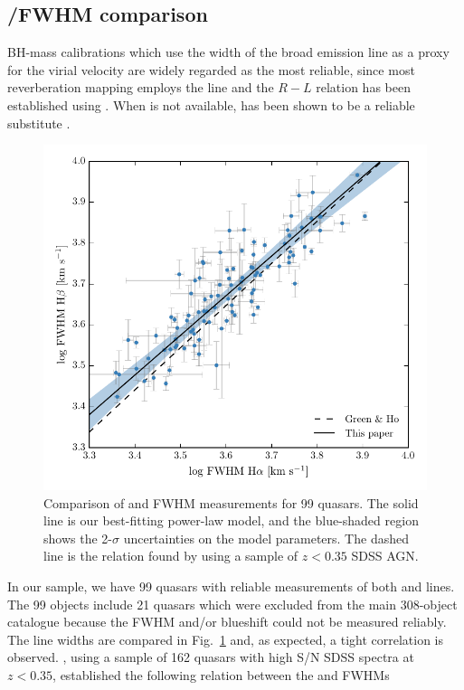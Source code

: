 \subsection{\hans/\hb FWHM comparison}
\label{sec:hahbcomparison}

BH-mass calibrations which use the width of the broad \hb emission line as a proxy for the virial velocity are widely regarded as the most reliable, since most reverberation mapping employs the \hb line and the $R-L$ relation has been established using \hbns.
When \hb is not available, \ha has been shown to be a reliable substitute \citep[e.g.][]{greene05,shen11,shen12}. 

\begin{figure}
    \centering 
    \includegraphics[width=0.8\columnwidth]{figures/chapter03/ha_hb_width_comparison.pdf} 
    \caption{Comparison of \ha and \hb FWHM measurements for 99 quasars. The solid line is our best-fitting power-law model, and the blue-shaded region shows the 2-$\sigma$ uncertainties on the model parameters. The dashed line is the relation found by \citet{greene05} using a sample of $z<0.35$ SDSS AGN.} 
    \label{fig:hahbcomp}
\end{figure}

In our sample, we have 99 quasars with reliable measurements of both \ha and \hb lines. 
The 99 objects include 21 quasars which were excluded from the main 308-object catalogue because the  FWHM and/or blueshift could not be measured reliably. 
The line widths are compared in Fig.~\ref{fig:hahbcomp} and, as expected, a tight correlation is observed.  
\citet{greene05}, using a sample of 162 quasars with high S/N SDSS spectra at $z < 0.35$, established the following relation between the \ha and \hb FWHMs

